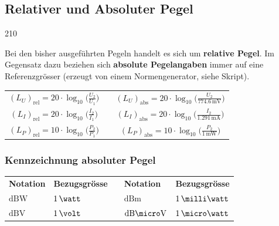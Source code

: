 \subsection{Relativer und Absoluter Pegel}{210}

Bei den bisher ausgeführten Pegeln handelt es sich um \textbf{relative Pegel}. Im Gegensatz dazu beziehen sich
\textbf{absolute Pegelangaben} immer auf eine Referenzgrösser (erzeugt von einem Normengenerator, siehe Skript). 

\renewcommand{\arraystretch}{1.7}
\begin{tabular}{c c c}
    $(L_U)_{\text{rel}} = 20 \cdot \log_{10} \Big( \frac{U_2}{U_1} \Big)$ & &
    $(L_U)_{\text{abs}} = 20 \cdot \log_{10} \Big( \frac{U_2}{774.6 \, \mathrm{mV}} \Big)$ \\
    
    $(L_I)_{\text{rel}} = 20 \cdot \log_{10} \Big( \frac{I_2}{I_1} \Big)$ & &
    $(L_I)_{\text{abs}} = 20 \cdot \log_{10} \Big( \frac{I_2}{1.291 \, \mathrm{mA}} \Big)$ \\
    
    $(L_P)_{\text{rel}} = 10 \cdot \log_{10} \Big( \frac{P_2}{P_1} \Big)$ & &
    $(L_P)_{\text{abs}} = 10 \cdot \log_{10} \Big( \frac{P_2}{1 \, \mathrm{mW}} \Big)$ \\
\end{tabular}
\renewcommand{\arraystretch}{1}


\subsubsection{Kennzeichnung absoluter Pegel}

\begin{tabular}{ll c ll}
    \textbf{Notation}       & \textbf{Bezugsgrösse} & & 
    \textbf{Notation}       & \textbf{Bezugsgrösse} \\
    $\mathrm{dBW}$          & $1 \, \watt$          & & 
    $\mathrm{dBm}$          & $1 \, \milli \watt$ \\
    $\mathrm{dBV}$          & $1 \, \volt$          & & 
    $\mathrm{dB \micro V}$  & $1 \, \micro \watt$ 
\end{tabular}
